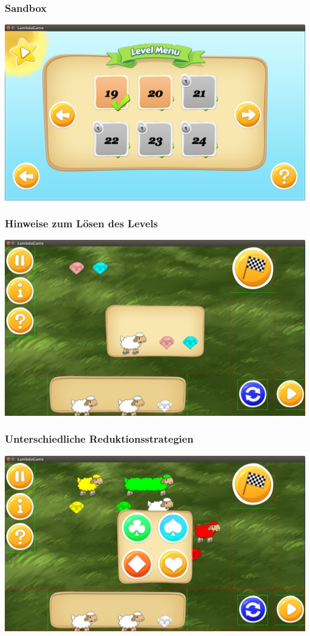 \documentclass[18pt]{beamer}
\begin{document}
\begin{frame}
	\frametitle{Sandbox}
	\includegraphics[width=\textwidth]{pictures/levelselectionmenu}
\end{frame}

\begin{frame}
	\frametitle{Hinweise zum Lösen des Levels}
	\includegraphics[width=\textwidth]{pictures/hintbutton}
\end{frame}

\begin{frame}
	\frametitle{Unterschiedliche Reduktionsstrategien}
	\includegraphics[width=\textwidth]{pictures/reduction_strategies}
\end{frame}
\end{document}
